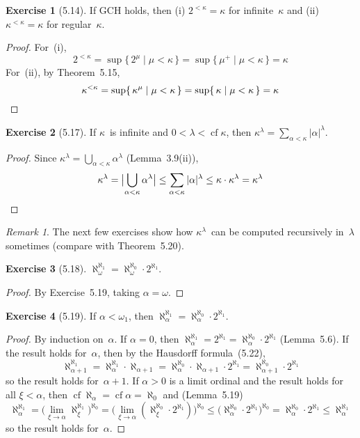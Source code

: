 \documentclass[letterpaper,12pt]{article}
\newcommand{\al}{\aleph}
\newcommand{\alo}{\al_{\omega}}
\newcommand{\bigunion}{\bigcup}
\newcommand{\mult}{\cdot}
\DeclareMathOperator{\cf}{cf}
\newcommand{\csuc}[1]{#1^+}
\newcommand{\card}[1]{|#1|}
\newcommand{\bigcard}[1]{\bigl|#1\bigr|}
\theoremstyle{definition}
\newtheorem*{exer}{Exercise}
\theoremstyle{remark}
\newtheorem*{rmk}{Remark}
\begin{document}
\begin{exer}[5.14]
If GCH holds, then (i) \(2^{<\kappa}=\kappa\) for infinite~\(\kappa\) and (ii) \(\kappa^{<\kappa}=\kappa\) for regular~\(\kappa\).
\end{exer}
\begin{proof}
For~(i),
\[2^{<\kappa}=\sup\{\,2^\mu\mid\mu<\kappa\,\}=\sup\{\,\csuc{\mu}\mid\mu<\kappa\,\}=\kappa\]
For~(ii), by Theorem~5.15,
\[\kappa^{<\kappa}=\sup\{\,\kappa^\mu\mid\mu<\kappa\,\}=\sup\{\,\kappa\mid\mu<\kappa\,\}=\kappa\qedhere\]
\end{proof}

\begin{exer}[5.17]
If \(\kappa\)~is infinite and \(0<\lambda<\cf\kappa\), then \(\kappa^{\lambda}=\sum_{\alpha<\kappa}\card{\alpha}^{\lambda}\).
\end{exer}
\begin{proof}
Since \(\kappa^{\lambda}=\bigunion_{\alpha<\kappa}\alpha^{\lambda}\) (Lemma~3.9(ii)),
\[\kappa^{\lambda}=\bigcard{\bigunion_{\alpha<\kappa}\alpha^{\lambda}}\le\sum_{\alpha<\kappa}\card{\alpha}^{\lambda}\le\kappa\mult\kappa^{\lambda}=\kappa^{\lambda}\qedhere\]
\end{proof}

\begin{rmk}
The next few exercises show how \(\kappa^{\lambda}\)~can be computed recursively in~\(\lambda\) sometimes (compare with Theorem~5.20).
\end{rmk}

\begin{exer}[5.18]
\(\alo^{\al_1}=\alo^{\al_0}\mult 2^{\al_1}\).
\end{exer}
\begin{proof}
By Exercise~5.19, taking \(\alpha=\omega\).
\end{proof}

\begin{exer}[5.19]
If \(\alpha<\omega_1\), then \(\al_{\alpha}^{\al_1}=\al_{\alpha}^{\al_0}\mult 2^{\al_1}\).
\end{exer}
\begin{proof}
By induction on~\(\alpha\). If \(\alpha=0\), then \(\al_{\alpha}^{\al_1}=2^{\al_1}=\al_{\alpha}^{\al_0}\mult 2^{\al_1}\) (Lemma~5.6). If the result holds for~\(\alpha\), then by the Hausdorff formula~(5.22),
\[\al_{\alpha+1}^{\al_1}=\al_{\alpha}^{\al_1}\mult\al_{\alpha+1}=\al_{\alpha}^{\al_0}\mult\al_{\alpha+1}\mult 2^{\al_1}=\al_{\alpha+1}^{\al_0}\mult 2^{\al_1}\]
so the result holds for~\(\alpha+1\). If \(\alpha>0\) is a limit ordinal and the result holds for all \(\xi<\alpha\), then \(\cf\al_{\alpha}=\cf\alpha=\al_0\) and (Lemma~5.19)
\[\al_{\alpha}^{\al_1}=\bigl(\lim_{\xi\to\alpha}\al_{\xi}^{\al_1}\bigr)^{\al_0}=\bigl(\lim_{\xi\to\alpha}(\al_{\xi}^{\al_0}\mult 2^{\al_1})\bigr)^{\al_0}\le\bigl(\al_{\alpha}^{\al_0}\mult 2^{\al_1}\bigr)^{\al_0}=\al_{\alpha}^{\al_0}\mult 2^{\al_1}\le\al_{\alpha}^{\al_1}\]
so the result holds for~\(\alpha\).
\end{proof}
\end{document}
